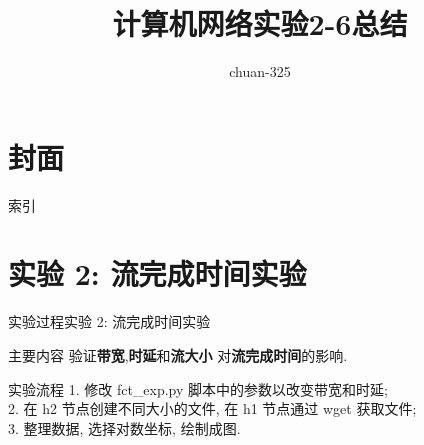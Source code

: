 \documentclass{beamer}
\title{计算机网络实验2-6总结}
\author{chuan-325}
\institute[UCAS]{University of Chinese Academy of Sciences}
\begin{document}
\section*{封面}
\begin{frame}
    \maketitle
\end{frame}

\begin{frame}{索引}
    \tableofcontents
\end{frame}
\section{实验 2: 流完成时间实验}
\begin{frame}
    \sectionpage
\end{frame}

\begin{frame}{实验过程}{实验 2: 流完成时间实验}
    \begin{block}{主要内容}
        验证\textbf{带宽},\textbf{时延}和\textbf{流大小}
        对\textbf{流完成时间}的影响.
    \end{block}
    \begin{block}{实验流程}
        1. 修改 fct\_exp.py 脚本中的参数以改变带宽和时延;\\
        2. 在 h2 节点创建不同大小的文件, 在 h1 节点通过 wget
        获取文件;\\
        3. 整理数据, 选择对数坐标, 绘制成图.
    \end{block}
\end{frame}
\end{document}
